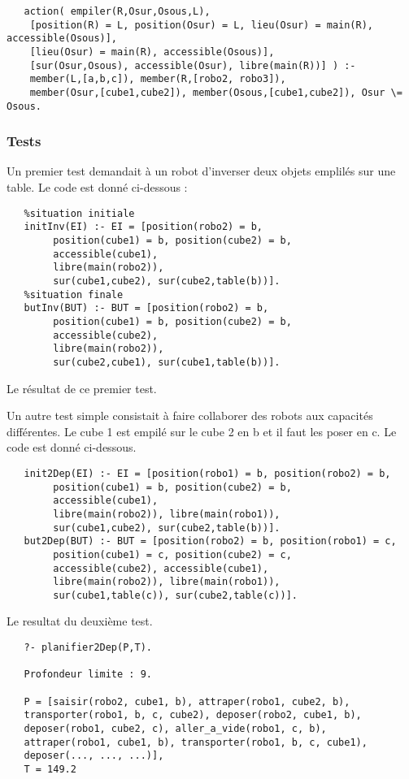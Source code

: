 \documentclass[a4paper,10pt]{article}
\begin{document}
   \begin{lstlisting}
   action( empiler(R,Osur,Osous,L),
	[position(R) = L, position(Osur) = L, lieu(Osur) = main(R), accessible(Osous)],
	[lieu(Osur) = main(R), accessible(Osous)],
	[sur(Osur,Osous), accessible(Osur), libre(main(R))] ) :-
	member(L,[a,b,c]), member(R,[robo2, robo3]), 
	member(Osur,[cube1,cube2]), member(Osous,[cube1,cube2]), Osur \= Osous.
   \end{lstlisting}
   
   \subsubsection{Tests}
   
   Un premier test demandait \`{a} un robot d'inverser deux objets emplil\'{e}s sur une table. Le code est donn\'{e} ci-dessous :
   
   \begin{lstlisting}
   %situation initiale
   initInv(EI) :- EI = [position(robo2) = b, 
		position(cube1) = b, position(cube2) = b, 
		accessible(cube1), 
		libre(main(robo2)), 
		sur(cube1,cube2), sur(cube2,table(b))].
   %situation finale
   butInv(BUT) :- BUT = [position(robo2) = b, 
		position(cube1) = b, position(cube2) = b, 
		accessible(cube2), 
		libre(main(robo2)),
		sur(cube2,cube1), sur(cube1,table(b))].
   \end{lstlisting}
   
   Le r\'{e}sultat de ce premier test.
   
   Un autre test simple consistait \`{a} faire collaborer des robots aux capacit\'{e}s diff\'{e}rentes. Le cube 1 est empil\'{e} sur le cube 2
   en b et il faut les poser en c. Le code est donn\'{e} ci-dessous.
   
   \begin{lstlisting}
   init2Dep(EI) :- EI = [position(robo1) = b, position(robo2) = b,
		position(cube1) = b, position(cube2) = b, 
		accessible(cube1), 
		libre(main(robo2)), libre(main(robo1)),
		sur(cube1,cube2), sur(cube2,table(b))].
   but2Dep(BUT) :- BUT = [position(robo2) = b, position(robo1) = c,
		position(cube1) = c, position(cube2) = c, 
		accessible(cube2), accessible(cube1),
		libre(main(robo2)), libre(main(robo1)),
		sur(cube1,table(c)), sur(cube2,table(c))].
   \end{lstlisting}
   
   Le resultat du deuxi\`{e}me test.
   
   \begin{lstlisting}
   ?- planifier2Dep(P,T).

   Profondeur limite : 9.

   P = [saisir(robo2, cube1, b), attraper(robo1, cube2, b), 
   transporter(robo1, b, c, cube2), deposer(robo2, cube1, b), 
   deposer(robo1, cube2, c), aller_a_vide(robo1, c, b), 
   attraper(robo1, cube1, b), transporter(robo1, b, c, cube1), 
   deposer(..., ..., ...)],
   T = 149.2 
   \end{lstlisting}
   
\end{document}
